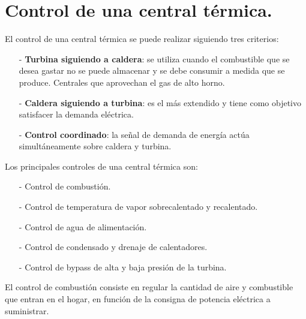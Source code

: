 \section{Control de una central térmica.}
El control de una central térmica se puede realizar siguiendo tres criterios:
\begin{itemize}
	\item [-] \textbf{Turbina siguiendo a caldera}: se utiliza cuando el combustible que se desea gastar no se puede almacenar y se debe consumir a medida que se produce. Centrales que aprovechan el gas de alto horno.
	\item [-] \textbf{Caldera siguiendo a turbina}: es el más extendido y tiene como objetivo satisfacer la demanda eléctrica. 
	\item [-] \textbf{Control coordinado}:
	la señal de demanda de energía actúa simultáneamente sobre caldera y turbina.
\end{itemize}


Los principales controles de una central térmica son:
\begin{itemize}
	\item [-] Control de combustión.
	\item [-] Control de temperatura de vapor sobrecalentado y recalentado.
	\item [-] Control de agua de alimentación.
	\item [-] Control de condensado y drenaje de calentadores.
	\item [-] Control de bypass de alta y baja presión de la turbina.
\end{itemize}

El control de combustión consiste en regular la cantidad de aire y combustible que entran en el hogar, en función de la consigna de potencia eléctrica a suministrar.